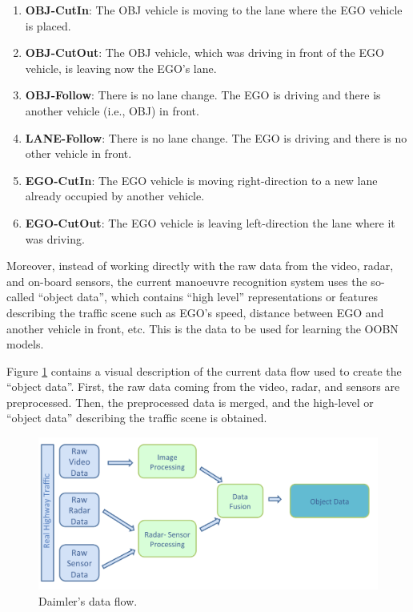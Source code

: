 \begin{enumerate}
\item \textbf{OBJ-CutIn}: The OBJ vehicle is moving to the lane where the EGO vehicle is placed.
\item \textbf{OBJ-CutOut}: The OBJ vehicle, which was driving in front of the EGO vehicle, is leaving now the EGO's lane.
\item \textbf{OBJ-Follow}: There is no lane change. The EGO is driving and there is another vehicle (i.e., OBJ) in front.
\item \textbf{LANE-Follow}: There is no lane change. The EGO is driving and there is no other vehicle in front.
\item \textbf{EGO-CutIn}: The EGO vehicle is moving right-direction to a new lane already occupied by another vehicle. 
\item \textbf{EGO-CutOut}: The EGO vehicle is leaving left-direction the lane where it was driving.
\end{enumerate}

Moreover, instead of working directly with the raw data from the video, radar, and on-board sensors, the current manoeuvre recognition system uses the so-called ``object data'', which contains ``high level'' representations or features describing the traffic scene such as EGO's speed, distance between EGO and another vehicle in front, etc. This is the data to be used for learning the OOBN models.

Figure \ref{Figure:DaimlerDataFlow} contains a visual description of the current data flow used to create the ``object data''.  First, the raw data coming from the video, radar, and sensors are preprocessed. Then, the preprocessed data is merged, and the high-level or ``object data'' describing the traffic scene is obtained. 

\begin{figure}[ht!]
\begin{center}
\includegraphics[scale=0.35]{./figures/DaimlerDataFlow}
\caption{\label{Figure:DaimlerDataFlow} Daimler's data flow.}
\end{center}
\end{figure}

